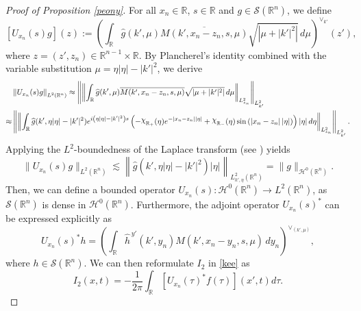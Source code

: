 \documentclass[preprint,compress,12pt]{elsarticle}
\numberwithin{equation}{section}
\begin{document}
\begin{proof}[Proof of Proposition \ref{peony}]
	For all $x_{n}\in\mathbb{R}$, $s\in\mathbb{R}$ and $g\in \mathscr{S}(\mathbb{R}^{n})$, we define
	\begin{equation}\label{oper}
		\left[U_{x_{n}}(s)g\right] (z) :=  \left(\int_{\mathbb{R}} \widehat{g}(k',\mu) \overline{M(k',x_{n}-z_{n},s,\mu)}\sqrt{\left|\mu+|k'|^{2}\right|}\, d\mu \right)^{\vee_{k'}} (z'),
	\end{equation}
	where $z=(z',z_{n})\in\mathbb{R}^{n-1}\times\mathbb{R}$. By Plancherel's identity combined with the variable substitution  $\mu=\eta|\eta|-|k'|^{2}$, we derive
	{\footnotesize	\begin{equation*}
			\begin{aligned}
				&\left\|U_{x_{n}}(s)g\right\|_{L^{2}(\mathbb{R}^{n})}\approx \left\|   \left\|\int_{\mathbb{R}} \widehat{g}(k',\mu) \overline{M(k',x_{n}-z_{n},s,\mu)}\sqrt{\left|\mu+|k'|^{2}\right|} \,d\mu \right\|_{L^{2}_{z_{n}}} \right\|_{L_{k'}^{2}}\\
				\approx &
				\left\|\left\|\int_{\mathbb{R}} \widehat{g}(k',\eta|\eta|-|k'|^{2}) e^{i\left(\eta|\eta|-|k'|^{2}\right)s}\left(-\raisebox{0.5ex}{$\chi$}_{\mathbb{R}_{+}} (\eta) e^{-|x_{n}-z_{n}||\eta|}+\raisebox{0.5ex}{$\chi$}_{\mathbb{R}_{-}}(\eta)\sin \left(\left|x_{n}-z_{n}\right|\left|\eta\right|\right)\right)|\eta|\, d\eta\right\|_{L^{2}_{z_{n}}} \right\|_{L_{k'}^{2}}.
			\end{aligned}
	\end{equation*}}
	Applying the $L^{2}$-boundedness of the Laplace transform (see \cite{kdv}) yields
	\begin{equation}\label{tass}
		\|U_{x_{n}}(s)g\|_{L^{2}(\mathbb{R}^{n})}\lesssim \left\|\widehat{g}\left(k',\eta|\eta|-|k'|^{2}\right)	\left|\eta\right|\right\|_{L^{2}_{k',\eta}(\mathbb{R}^{n})}=\|g\|_{\mathcal{H}^{0}(\mathbb{R}^{n})}.
	\end{equation}
	Then, we can define a bounded operator $U_{x_{n}}(s):\mathcal{H}^{0}(\mathbb{R}^{n})\rightarrow L^{2}(\mathbb{R}^{n})$,  as $\mathscr{S}(\mathbb{R}^{n})$ is dense in $\mathcal{H}^{0}(\mathbb{R}^{n})$. Furthermore, the adjoint operator $U_{x_{n}}(s)^{*}$  can be expressed explicitly as	
	\begin{equation}\label{adj}
		U_{x_{n}}(s)^{*}h= \left(\int_{\mathbb{R}} \widehat{h}^{\,y'}(k',y_{n}) M(k',x_{n}-y_{n},s,\mu)\,dy_{n}\right)^{\vee_{(k',\mu)}},
	\end{equation}
	where $h\in\mathscr{S}(\mathbb{R}^{n})$. We can then reformulate $I_{2}$ in \eqref{kee} as
	\begin{equation}
		I_{2}(x,t)=-\frac{1}{2\pi}\int_{\mathbb{R}}\left[U_{x_{n}}(\tau)^{*}f(\tau)\right](x',t)d\tau. \end{equation}

\end{proof}
\end{document}
